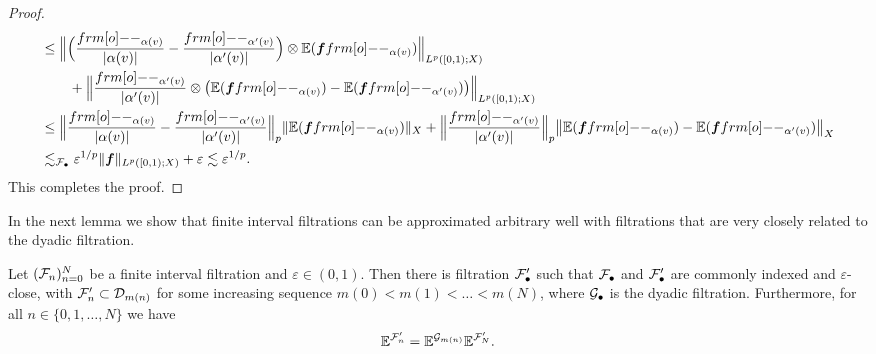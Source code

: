 \begin{proof}
\begin{equation*}
\begin{aligned}
    &\leq \Big\| \Big( \frac{\1_{\alpha(v)}}{|\alpha(v)|} - \frac{\1_{\alpha'(v)}}{|\alpha'(v)|}\Big) \otimes \E(\mb{f}\1_{\alpha(v)}) \Big\|_{L^p([0,1);X)} \\
    &\qquad + \Big\| \frac{\1_{\alpha'(v)}}{|\alpha'(v)|} \otimes \big( \E(\mb{f}\1_{\alpha(v)}) -  \E(\mb{f}\1_{\alpha'(v)}) \big)\Big\|_{L^p([0,1);X)}\\
    &\leq  \Big\| \frac{\1_{\alpha(v)}}{|\alpha(v)|} - \frac{\1_{\alpha'(v)}} {|\alpha'(v)|} \Big\|_{p} \| \E(\mb{f}\1_{\alpha(v)}) \|_{X}
    + \Big\| \frac{\1_{\alpha'(v)}}{|\alpha'(v)|} \Big\|_{p} \big\|  \E(\mb{f}\1_{\alpha(v)}) -  \E(\mb{f}\1_{\alpha'(v)}) \big\|_{X} \\
    &\lesssim_{\mc{F}_{\bullet}} \varepsilon^{1/p} \|\mb{f}\|_{L^p([0,1);X)} + \varepsilon \lesssim \varepsilon^{1/p}.
  \end{aligned}
\end{equation*}
This completes the proof.
\end{proof}


In the next lemma we show that finite interval filtrations can be approximated arbitrary well with filtrations that are very closely related to the dyadic filtration.

\begin{lem}\label{lem:dyadic-approximation}
  Let $(\mathcal{F}_{n})_{n=0}^{N}$ be a finite interval filtration and $\varepsilon \in (0,1)$.
  Then there is filtration $\mathcal{F}'_{\bullet}$ such that $\mathcal{F}_{\bullet}$ and $\mathcal{F}'_{\bullet}$ are commonly indexed and $\varepsilon$-close, with $\mathcal{F}'_{n} \subset \mathcal{D}_{m(n)}$ for some increasing sequence $m(0) < m(1) < \ldots < m(N)$, where $\mathcal{G}_{\bullet}$ is the dyadic filtration.
  Furthermore, for all $n \in \{0,1,\ldots,N\}$ we have
  \begin{equation}\label{eq:approx-CE-ident}
    \mathbb{E}^{\mathcal{F}'_{n}} = \mathbb{E}^{\mathcal{G}_{m(n)}} \mathbb{E}^{\mathcal{F}'_{N}}.
  \end{equation}
\end{lem}

